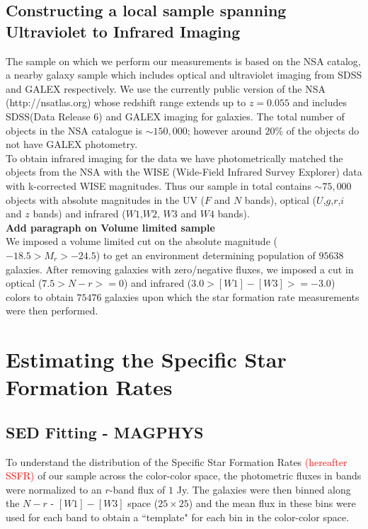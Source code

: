 \documentclass[iop]{emulateapj}
\begin{document}
\subsection{Constructing a local sample spanning Ultraviolet to Infrared Imaging}


The sample on which we perform our measurements is based on the NSA catalog, a nearby galaxy sample which includes optical and ultraviolet imaging from SDSS and GALEX respectively. We use the currently public version of the NSA (http://nsatlas.org) whose redshift range extends up to $z = 0.055$ and includes SDSS(Data Release $6$) and GALEX imaging for galaxies. The total number of objects in the NSA catalogue is $\sim150,000$; however around $20\%$ of the objects do not have GALEX photometry.  \\


To obtain infrared imaging for the data we have photometrically matched the objects from the NSA with the WISE (Wide-Field Infrared Survey Explorer) data with k-corrected WISE magnitudes. Thus our sample in total contains $\sim75,000$ objects with absolute magnitudes in the UV ($F$ and $N$ bands), optical ($U$,$g$,$r$,$i$ and $z$ bands) and infrared ($W1$,$W2$, $W3$ and $W4$ bands). \\


\textbf{Add paragraph on Volume limited sample}\\
We imposed a volume limited cut on the absolute magnitude ( $-18.5 > M_{r}  > -24.5$) to get an environment determining population of $95638$ galaxies. After removing galaxies with zero/negative fluxes, we imposed a cut in optical ($7.5> N-r >=0 $) and infrared ($3.0> [W1]- [W3] >= -3.0$) colors to obtain $75476$ galaxies upon which the star formation rate measurements were then performed.\\



\section{Estimating the Specific Star Formation Rates}

\subsection{SED Fitting - MAGPHYS}

To understand the distribution of the Specific Star Formation Rates \textcolor{red}{(hereafter SSFR)} of our sample across the color-color space,  the photometric fluxes in bands  were normalized to an $r$-band flux of $1$ Jy. The galaxies were then binned along the $N-r$ - $[W1]-[W3]$ space ($25\times25$) and the mean flux in these bins were used for each band to obtain a ``template" for each bin in the color-color space.\\
\end{document}
